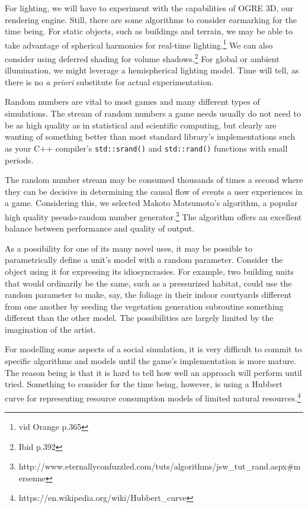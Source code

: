For lighting, we will have to experiment with the capabilities of OGRE 3D, our rendering engine. Still, there are some algorithms to consider earmarking for the time being. For static objects, such as buildings and terrain, we may be able to take advantage of spherical harmonics for real-time lighting.\footnote{vid Orange p.365} We can also consider using deferred shading for volume shadows.\footnote{Ibid p.392} For global or ambient illumination, we might leverage a hemispherical lighting model. Time will tell, as there is no {\it a priori} substitute for actual experimentation.

Random numbers are vital to most games and many different types of simulations. The stream of random numbers a game needs usually do not need to be as high quality as in statistical and scientific computing, but clearly are wanting of something better than most standard library's implementations such as your C++ compiler's {\tt std::srand()} and {\tt std::rand()} functions with small periods. 

The random number stream may be consumed thousands of times a second where they can be decisive in determining the causal flow of events a user experiences in a game. Considering this, we selected Makoto Matsumoto's algorithm, a popular high quality pseudo-random number generator.\footnote{http://www.eternallyconfuzzled.com/tuts/algorithms/jsw_tut_rand.aspx\#mersenne} The algorithm offers an excellent balance between performance and quality of output.

As a possibility for one of its many novel uses, it may be possible to parametrically define a unit's model with a random parameter. Consider the object using it for expressing its idiosyncrasies. For example, two building units that would ordinarily be the same, such as a pressurized habitat, could use the random parameter to make, say, the foliage in their indoor courtyards different from one another by seeding the vegetation generation subroutine something different than the other model. The possibilities are largely limited by the imagination of the artist.

For modelling some aspects of a social simulation, it is very difficult to commit to specific algorithms and models until the game's implementation is more mature. The reason being is that it is hard to tell how well an approach will perform until tried. Something to consider for the time being, however, is using a Hubbert curve for representing resource consumption models of limited natural resources.\footnote{https://en.wikipedia.org/wiki/Hubbert_curve}

